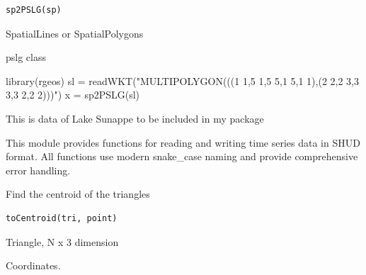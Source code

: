 \documentclass[a4paper]{book}
\begin{document}
%
\begin{Usage}
\begin{verbatim}
sp2PSLG(sp)
\end{verbatim}
\end{Usage}
%
\begin{Arguments}
\begin{ldescription}
\item[\code{sp}] SpatialLines or SpatialPolygons
\end{ldescription}
\end{Arguments}
%
\begin{Value}
pslg class
\end{Value}
%
\begin{Examples}
\begin{ExampleCode}
library(rgeos)
sl = readWKT("MULTIPOLYGON(((1 1,5 1,5 5,1 5,1 1),(2 2,2 3,3 3,3 2,2 2)))")
x = sp2PSLG(sl)
\end{ExampleCode}
\end{Examples}
%
\begin{Description}\relax
This is data of Lake Sunappe to be included in my package
\end{Description}
%
\begin{Description}\relax
This module provides functions for reading and writing time series data
in SHUD format. All functions use modern snake\_case naming and provide
comprehensive error handling.
\end{Description}
%
\begin{Description}\relax
Find the centroid of the triangles
\end{Description}
%
\begin{Usage}
\begin{verbatim}
toCentroid(tri, point)
\end{verbatim}
\end{Usage}
%
\begin{Arguments}
\begin{ldescription}
\item[\code{tri}] Triangle, N x 3 dimension

\item[\code{point}] Coordinates.
\end{ldescription}
\end{Arguments}
\end{document}
